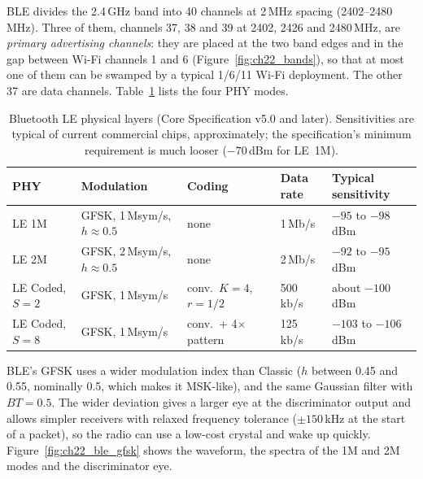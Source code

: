 BLE divides the 2.4\,GHz band into 40 channels at 2\,MHz spacing (2402--2480\,MHz). Three of them,
channels 37, 38 and 39 at 2402, 2426 and 2480\,MHz, are \emph{primary advertising channels}: they are
placed at the two band edges and in the gap between Wi-Fi channels 1 and 6
(Figure~\ref{fig:ch22_bands}), so that at most one of them can be swamped by a typical 1/6/11 Wi-Fi
deployment. The other 37 are data channels. Table~\ref{tab:ch22:blephy} lists the four PHY modes.

\begin{table}[htbp]\centering\small
\caption{Bluetooth LE physical layers (Core Specification v5.0 and later). Sensitivities are
typical of current commercial chips, approximately; the specification's minimum requirement is
much looser ($-70$\,dBm for LE~1M).}
\label{tab:ch22:blephy}
\begin{tabular}{@{}l l l l l@{}}
\toprule
PHY & Modulation & Coding & Data rate & Typical sensitivity\\
\midrule
LE 1M & GFSK, 1\,Msym/s, $h\approx0.5$ & none & 1\,Mb/s & $-95$ to $-98$\,dBm\\
LE 2M & GFSK, 2\,Msym/s, $h\approx0.5$ & none & 2\,Mb/s & $-92$ to $-95$\,dBm\\
LE Coded, $S=2$ & GFSK, 1\,Msym/s & conv.\ $K=4$, $r=1/2$ & 500\,kb/s & about $-100$\,dBm\\
LE Coded, $S=8$ & GFSK, 1\,Msym/s & conv.\ + 4$\times$ pattern & 125\,kb/s & $-103$ to $-106$\,dBm\\
\bottomrule
\end{tabular}
\end{table}

BLE's GFSK uses a wider modulation index than Classic ($h$ between 0.45 and 0.55, nominally 0.5,
which makes it MSK-like), and the same Gaussian filter with $BT=0.5$. The wider deviation gives a
larger eye at the discriminator output and allows simpler receivers with relaxed frequency tolerance
($\pm150$\,kHz at the start of a packet), so the radio can use a low-cost crystal and wake up
quickly. Figure~\ref{fig:ch22_ble_gfsk} shows the waveform, the spectra of the 1M and 2M modes and
the discriminator eye.


